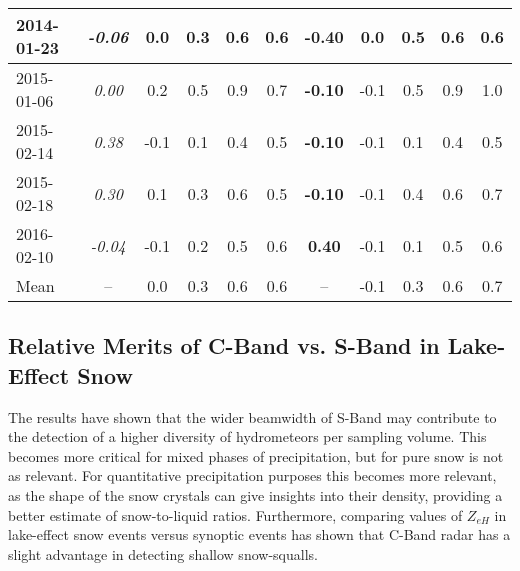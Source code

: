 \begin{table}[H]
\begin{center}
\begin{tabular}{|l|c|c|c|c|c|c|c|c|c|c|}
    \hline\hline
    2014-01-23 & \textit{-0.06} & 0.0 & 0.3 & 0.6 & 0.6 & \textbf{-0.40} & 0.0 & 0.5 & 0.6 & 0.6\\
    \hline
    2015-01-06 & \textit{0.00} & 0.2 & 0.5 & 0.9 & 0.7 & \textbf{-0.10} & -0.1 & 0.5 & 0.9 & 1.0 \\
    \hline
    2015-02-14 & \textit{0.38} & -0.1 & 0.1 & 0.4 & 0.5 & \textbf{-0.10} & -0.1 & 0.1 & 0.4 & 0.5 \\
    \hline
    2015-02-18 & \textit{0.30} & 0.1 & 0.3 & 0.6 & 0.5 & \textbf{-0.10} & -0.1 & 0.4 & 0.6 & 0.7 \\ 
    \hline
    2016-02-10 & \textit{-0.04} & -0.1 & 0.2 & 0.5 & 0.6 & \textbf{0.40} & -0.1 & 0.1 & 0.5 & 0.6  \\ 
    \hline\hline
    Mean & -- & 0.0 & 0.3 & 0.6 & 0.6 & -- & -0.1 & 0.3 & 0.6 & 0.7 \\
    \hline
    \end{tabular}
    \end{center}
\end{table}

\subsection{Relative Merits of C-Band vs. S-Band in Lake-Effect Snow}
The results have shown that the wider beamwidth of S-Band may contribute to the detection of a higher diversity of hydrometeors per sampling volume. This
becomes more critical for mixed phases of precipitation, but for pure snow is not as relevant. For quantitative precipitation purposes this becomes more
relevant, as the shape of the snow crystals can give insights into their density, providing a better estimate of snow-to-liquid ratios. Furthermore,
comparing values of $Z_{eH}$ in lake-effect snow events versus synoptic events has shown that C-Band radar has a slight advantage in detecting shallow snow-squalls.

